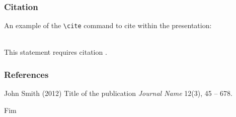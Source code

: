 \documentclass{beamer}
\begin{document}
\begin{frame}[fragile] %
\frametitle{Citation}
An example of the \verb|\cite| command to cite within the presentation:\\~

This statement requires citation \cite{p1}.
\end{frame}


\begin{frame}
\frametitle{References}
\footnotesize{
\begin{thebibliography}{99} %
 John Smith (2012)
\newblock Title of the publication
\newblock \emph{Journal Name} 12(3), 45 -- 678.
\end{thebibliography}
}
\end{frame}


\begin{frame}
\Huge{\centerline{Fim}}
\end{frame}

\end{document}
